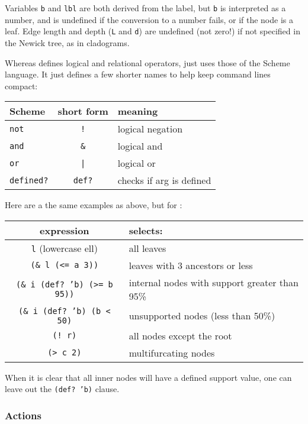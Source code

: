 \noindent{}Variables \texttt{b} and \texttt{lbl} are both derived from the
label, but \texttt{b} is interpreted as a number, and is undefined if the
conversion to a number fails, or if the node is a leaf. Edge length and depth
(\texttt{L} and \texttt{d}) are undefined (not zero!) if not specified in the
Newick tree, as in cladograms.

Whereas \ed{} defines logical and relational operators, \sched{} just uses those
of the Scheme language. It just defines a few shorter names to help keep command
lines compact:

\begin{center}
\begin{tabular}{lcl}
Scheme & \sched{} short form & meaning \\
\hline
\texttt{not} 	& \texttt{!} 				& logical negation \\
\texttt{and} 	& \texttt{\&} 			& logical and \\
\texttt{or}  	& \texttt{|} 				& logical or \\
\texttt{defined?}	& \texttt{def?}	& checks if arg is defined
\end{tabular}
\end{center}

\noindent{}Here are a the same examples as above, but for \sched:

\begin{center}
\begin{tabular}{cl}
expression & selects: \\
\hline
\texttt{l} (lowercase ell) & all leaves \\
\texttt{(\& l (<= a 3))} & leaves with 3 ancestors or less \\
\texttt{(\& i (def? 'b) (>= b 95))} & internal nodes with support greater than 95\% \\ 
\texttt{(\& i (def? 'b) (b < 50)} & unsupported nodes (less than 50\%) \\
\texttt{(! r)} & all nodes except the root \\
\texttt{(> c 2)} & multifurcating nodes
\end{tabular}
\end{center}

\noindent{}When it is clear that all inner nodes will have a defined support
value, one can leave out the \texttt{(def? 'b)} clause.

\subsubsection{Actions}

